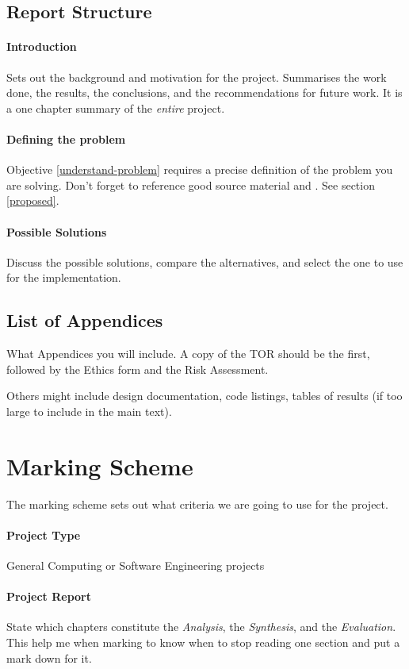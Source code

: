 \subsection{Report Structure}

\paragraph{Introduction}  Sets out the background and motivation for the project.  Summarises the work done, the results, the conclusions, and the recommendations for future work.  It is a one chapter summary of the \emph{entire} project.

\paragraph{Defining the problem}  Objective \ref{understand-problem} requires a precise definition of the problem you are solving.  Don't forget to reference good source material \citep{henning_schulzrinne} and \citep{talbot2013}.  See section \ref{proposed}.

\paragraph{Possible Solutions} Discuss the possible solutions, compare the
alternatives, and select the one to use for the  implementation.

\subsection{List of Appendices}
What Appendices you will include.  A copy of the TOR should be the first, followed by the Ethics form and the Risk Assessment.

Others might include design documentation, code listings, tables of results (if too large to include in the main text).

\section{Marking Scheme}
The marking scheme sets out what criteria we are going to use for the project.

\paragraph{Project Type} General Computing or Software Engineering projects

\paragraph{Project Report}  State which chapters constitute the \emph{Analysis}, the \emph{Synthesis}, and the \emph{Evaluation}.  This help me when marking to know when to stop reading one section and put a mark down for it.

